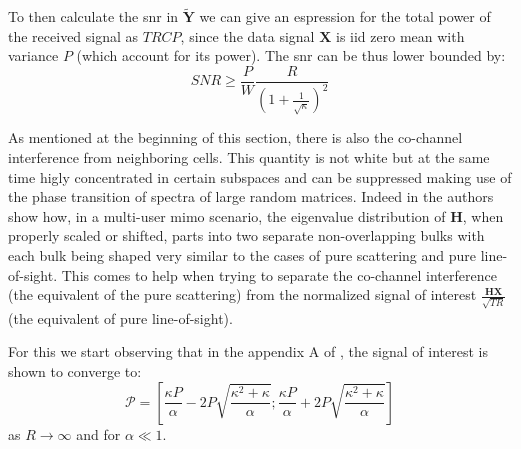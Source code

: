 \documentclass[11pt]{book}
\begin{document}
To then calculate the \gls{snr} in $\mathbf{\tilde{Y}}$ we can give an espression for the total power of the received signal as $TRCP$, since the data signal $\mathbf{X}$ is iid zero mean with variance $P$ (which account for its power). The \gls{snr} can be thus lower bounded by:
\begin{equation}
  SNR \geq \frac{P}{W}\frac{R}{\left(1+ \frac{1}{\sqrt{\kappa}}\right)^2}
\end{equation}


As mentioned at the beginning of this section, there is also the co-channel interference from neighboring cells. This quantity is not white but at the same time higly concentrated in certain subspaces and can be suppressed making use of the phase transition of spectra of large random matrices. Indeed in \cite{Ralf2012} the authors show how, in a multi-user \gls{mimo} scenario, the eigenvalue distribution of $\mathbf{H}$, when properly scaled or shifted, parts into two separate non-overlapping bulks with each bulk being shaped very similar to the cases of pure scattering and pure line-of-sight. This comes to help when trying to separate the co-channel interference (the equivalent of the pure scattering) from the normalized signal of interest $\frac{\mathbf{HX}}{\sqrt{TR}}$ (the equivalent of pure line-of-sight).

For this we start observing that in the appendix A of \cite{Ralf}, the signal of interest is shown to converge to:
\begin{equation}
  \mathcal{P} = \left[\frac{\kappa P}{\alpha}-2P\sqrt{\frac{\kappa^2 + \kappa}{\alpha}};\frac{\kappa P}{\alpha} + 2P\sqrt{\frac{\kappa^2 + \kappa}{\alpha}}\right]
\end{equation}
as $R \rightarrow \infty$ and for $\alpha \ll 1$.
\end{document}
